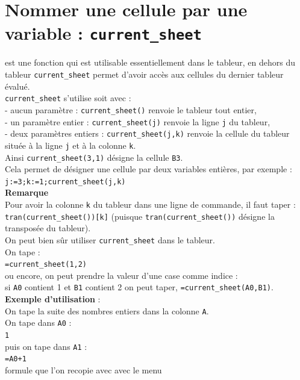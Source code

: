 \documentclass[a4paper,11pt]{book}
\begin{document}
\section{Nommer une cellule par une variable : {\tt current\_sheet}}\label{sec:currentsheet}
 est une fonction qui est utilisable
 essentiellement dans le tableur, en dehors du tableur {\tt current\_sheet}
permet d'avoir acc\`es aux cellules du dernier tableur \'evalu\'e.\\ 
{\tt current\_sheet} s'utilise soit avec :\\
- aucun  param\`etre : {\tt current\_sheet()} renvoie le tableur tout entier,\\
- un param\`etre entier : {\tt current\_sheet(j)} renvoie  la ligne {\tt j} 
du tableur,\\
- deux param\`etres entiers : {\tt current\_sheet(j,k)} renvoie  la cellule du 
tableur situ\'ee \`a  la ligne {\tt j} et \`a la colonne {\tt k}.\\
Ainsi {\tt current\_sheet(3,1)} d\'esigne la cellule {\tt B3}.\\
Cela permet de d\'esigner une cellule par deux variables enti\`eres, 
par exemple :\\
{\tt j:=3;k:=1;current\_sheet(j,k)}\\
{\bf Remarque}\\
Pour avoir la colonne {\tt k} du tableur dans une ligne de commande, il faut 
taper :\\
{\tt tran(current\_sheet())[k]} (puisque {\tt tran(current\_sheet())} 
d\'esigne la transpos\'ee du tableur).\\
On peut bien s\^ur utiliser {\tt current\_sheet} dans le tableur.\\
On tape :\\
{\tt =current\_sheet(1,2)}\\
ou encore, on peut prendre la valeur d'une case comme indice : \\
si {\tt A0} contient 1 et {\tt B1} contient 2 on peut taper,
{\tt =current\_sheet(A0,B1)}.\\
{\bf Exemple d'utilisation} :\\ 
On tape la suite des nombres entiers dans la colonne {\tt A}.\\
On tape dans {\tt A0} :\\
{\tt 1}\\
 puis on tape dans {\tt A1} :\\
{\tt  =A0+1}\\
formule que l'on recopie avec avec le menu 
\end{document}
